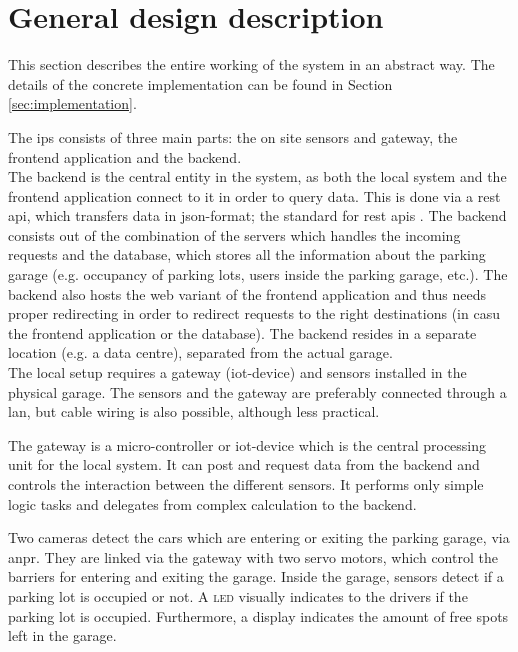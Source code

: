 \clearpage
\section{General design description}
This section describes the entire working of the system in an abstract way. The details of the concrete implementation can be found in Section \ref{sec:implementation}.

\ind The \ac{ips} consists of three main parts: the on site sensors and gateway, the frontend application and the backend. \\

The backend is the central entity in the system, as both the local system and the frontend application connect to it in order to query data. This is done via a \ac{rest} \ac{api}, which transfers data in \ac{json}-format; the standard for \ac{rest} \ac{api}s \cite{rest_apis}. The backend consists out of the combination of the servers which handles the incoming requests and the database, which stores all the information about the parking garage (e.g. occupancy of parking lots, users inside the parking garage, etc.).
The backend also hosts the web variant of the frontend application and thus needs proper redirecting in order to redirect requests to the right destinations (in casu the frontend application or the database). The backend resides in a separate location (e.g. a data centre), separated from the actual garage. \\

The local setup requires a gateway  (\ac{iot}-device) and sensors installed in the physical garage. The sensors and the gateway are preferably connected through a \ac{lan}, but cable wiring is also possible, although less practical.

\ind The gateway is a micro-controller or \ac{iot}-device which is the central processing unit for the local system. It can post and request data from the backend and controls the interaction between the different sensors. It performs only simple logic tasks and delegates from complex calculation to the backend.

\ind Two cameras detect the cars which are entering or exiting the parking garage, via \ac{anpr}. They are linked via the gateway with two servo motors, which control the barriers for entering and exiting the garage. Inside the garage, sensors detect if a parking lot is occupied or not. A \textsc{led} visually indicates to the drivers if the parking lot is occupied. Furthermore, a display indicates the amount of free spots left in the garage. \\

